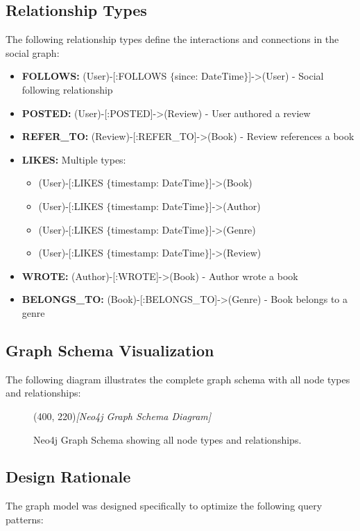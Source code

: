 \subsection{Relationship Types}
The following relationship types define the interactions and connections in the social graph:

\begin{itemize}
    \item \textbf{FOLLOWS:} (User)-[:FOLLOWS $\{$since: DateTime$\}$]->(User) - Social following relationship
    \item \textbf{POSTED:} (User)-[:POSTED]->(Review) - User authored a review
    \item \textbf{REFER\_TO:} (Review)-[:REFER\_TO]->(Book) - Review references a book
    \item \textbf{LIKES:} Multiple types:
    \begin{itemize}
        \item (User)-[:LIKES $\{$timestamp: DateTime$\}$]->(Book)
        \item (User)-[:LIKES $\{$timestamp: DateTime$\}$]->(Author)
        \item (User)-[:LIKES $\{$timestamp: DateTime$\}$]->(Genre)
        \item (User)-[:LIKES $\{$timestamp: DateTime$\}$]->(Review)
    \end{itemize}
    \item \textbf{WROTE:} (Author)-[:WROTE]->(Book) - Author wrote a book
    \item \textbf{BELONGS\_TO:} (Book)-[:BELONGS\_TO]->(Genre) - Book belongs to a genre
\end{itemize}

\subsection{Graph Schema Visualization}
The following diagram illustrates the complete graph schema with all node types and relationships:

\begin{figure}[H]
    \centering
    \framebox(400, 220){\textit{[Neo4j Graph Schema Diagram]}}
    \caption{Neo4j Graph Schema showing all node types and relationships.}
    \label{fig:neo4j_schema}
\end{figure}

\subsection{Design Rationale}
The graph model was designed specifically to optimize the following query patterns:

